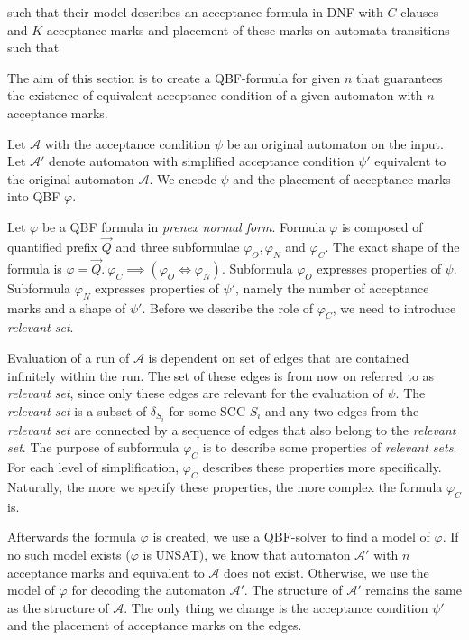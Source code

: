 \documentclass[a4paper,UKenglish,cleveref, autoref, thm-restate]{lipics-v2021}
\begin{document}
such that their model describes an acceptance formula in DNF
with $C$ clauses and $K$ acceptance marks and placement of these marks
on automata transitions such that 



The aim of this section is to create a QBF-formula for given $n$ that guarantees the existence of equivalent acceptance condition of a given automaton with $n$ acceptance marks. 
\smallskip

Let $\mathcal{A}$ with the acceptance condition $\psi$ be an original automaton on the input. Let $\mathcal{A}'$ denote automaton with simplified acceptance condition $\psi'$ equivalent to the original automaton $\mathcal{A}$. We encode $\psi$ and the placement of acceptance marks into QBF  $\varphi$.

Let $\varphi$ be a QBF formula in \emph{prenex normal form}. Formula $\varphi$
is composed of quantified prefix $\overrightarrow{Q}$ and three subformulae $\varphi_{O}, \varphi_{N} $ and $\varphi_{C}$. The exact shape of the formula is $\varphi = \overrightarrow{Q} . \  \varphi_{C} \implies ( \varphi_{O} \Longleftrightarrow \varphi_{N})$. 
Subformula $\varphi_{O}$ expresses properties of $\psi$. Subformula $\varphi_{N}$ expresses properties of $\psi'$, namely the number of acceptance marks and a shape of $\psi'$. Before we describe the role of $\varphi_{C}$, we need to introduce \emph{relevant set}.

\smallskip

Evaluation of a run of $\mathcal{A}$ is dependent on set of edges that are contained infinitely within the run. The set of these edges is from now on referred to as \emph{relevant set}, since only these edges are relevant for the evaluation of $\psi$. The \emph{relevant set} is a subset of $\delta_{S_{i}}$ for some SCC $S_{i}$ and any two edges from the \emph{relevant set} are connected by a sequence of edges that also belong to the \emph{relevant set}. The purpose of subformula $\varphi_{C}$ is to describe some properties of \emph{relevant sets}. For each level of simplification, $\varphi_{C}$ describes these properties more specifically. Naturally, the more we specify these properties, the more complex the formula $\varphi_{C}$ is. 

\smallskip

Afterwards the formula $\varphi$ is created, we use a QBF-solver to find a model of $\varphi$. If no such model exists ($\varphi$ is UNSAT), we know that automaton $\mathcal{A}'$ with $n$ acceptance marks and equivalent to $\mathcal{A}$ does not exist. Otherwise, we use the model of $\varphi$ for decoding the automaton $\mathcal{A}'$. The structure of $\mathcal{A}'$ remains the same as the structure of $\mathcal{A}$. The only thing we change is the acceptance condition $\psi'$ and the placement of acceptance marks on the edges. 
\end{document}
